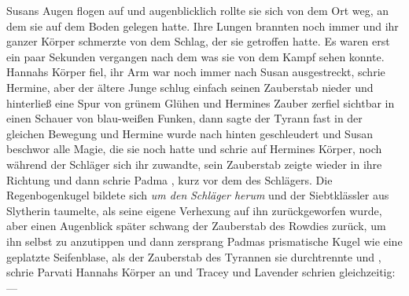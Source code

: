 Susans Augen flogen auf und augenblicklich rollte sie sich von dem Ort weg, an dem sie auf dem Boden gelegen hatte. Ihre Lungen brannten noch immer und ihr ganzer Körper schmerzte von dem Schlag, der sie getroffen hatte. Es waren erst ein paar Sekunden vergangen nach dem was sie von dem Kampf sehen konnte. Hannahs Körper fiel, ihr Arm war noch immer nach Susan ausgestreckt,  schrie Hermine, aber der ältere Junge schlug einfach seinen Zauberstab nieder und hinterließ eine Spur von grünem Glühen und Hermines Zauber zerfiel sichtbar in einen Schauer von blau-weißen Funken, dann sagte der Tyrann fast in der gleichen Bewegung  und Hermine wurde nach hinten geschleudert und Susan beschwor alle Magie, die sie noch hatte und schrie  auf Hermines Körper, noch während der Schläger sich ihr zuwandte, sein Zauberstab zeigte wieder in ihre Richtung und dann schrie Padma , kurz vor dem  des Schlägers. Die Regenbogenkugel bildete sich \emph{um den} \emph{Schläger herum} und der Siebtklässler aus Slytherin taumelte, als seine eigene Verhexung auf ihn zurückgeworfen wurde, aber einen Augenblick später schwang der Zauberstab des Rowdies zurück, um ihn selbst zu anzutippen und dann zersprang Padmas prismatische Kugel wie eine geplatzte Seifenblase, als der Zauberstab des Tyrannen sie durchtrennte und , schrie Parvati Hannahs Körper an und Tracey und Lavender schrien gleichzeitig: —

